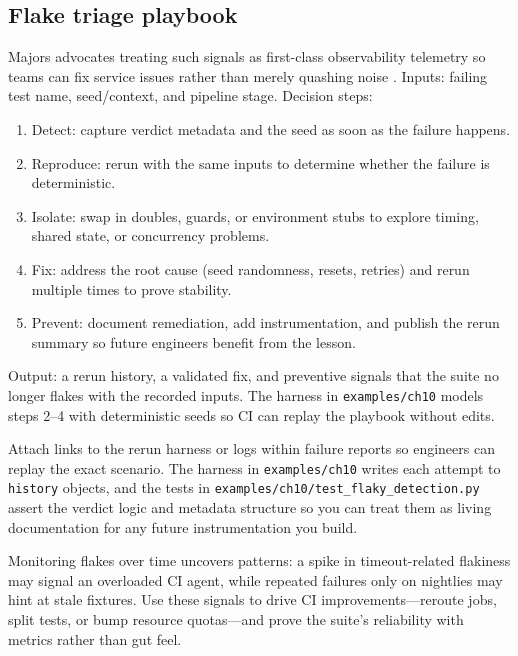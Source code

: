 \subsection{Flake triage playbook}
Majors advocates treating such signals as first-class observability telemetry so teams can fix service issues rather than merely quashing noise \citep{majors2023observability}.
Inputs: failing test name, seed/context, and pipeline stage. Decision steps:
\begin{enumerate}
  \item Detect: capture verdict metadata and the seed as soon as the failure happens.
  \item Reproduce: rerun with the same inputs to determine whether the failure is deterministic.
  \item Isolate: swap in doubles, guards, or environment stubs to explore timing, shared state, or concurrency problems.
  \item Fix: address the root cause (seed randomness, resets, retries) and rerun multiple times to prove stability.
  \item Prevent: document remediation, add instrumentation, and publish the rerun summary so future engineers benefit from the lesson.
\end{enumerate}
Output: a rerun history, a validated fix, and preventive signals that the suite no longer flakes with the recorded inputs. The harness in \texttt{examples/ch10} models steps 2–4 with deterministic seeds so CI can replay the playbook without edits.

Attach links to the rerun harness or logs within failure reports so engineers can replay the exact scenario. The harness in \texttt{examples/ch10} writes each attempt to \texttt{history} objects, and the tests in \texttt{examples/ch10/test\_flaky\_detection.py} assert the verdict logic and metadata structure so you can treat them as living documentation for any future instrumentation you build.

Monitoring flakes over time uncovers patterns: a spike in timeout-related flakiness may signal an overloaded CI agent, while repeated failures only on nightlies may hint at stale fixtures. Use these signals to drive CI improvements—reroute jobs, split tests, or bump resource quotas—and prove the suite’s reliability with metrics rather than gut feel.

